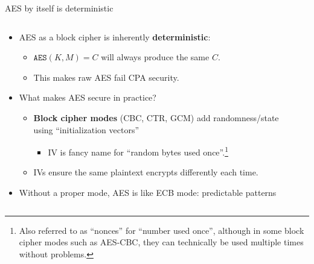 \documentclass[aspectratio=169, lualatex, handout]{beamer}
\begin{document}
\begin{frame}{AES by itself is deterministic}
	\begin{columns}[c]
		\begin{column}{0.7\textwidth}
			\begin{itemize}[<+->]
				\item AES as a block cipher is inherently \textbf{deterministic}:
				      \begin{itemize}
					      \item $\texttt{AES}(K, M) = C$ will always produce the same $C$.
					      \item This makes raw AES fail CPA security.
				      \end{itemize}
				\item What makes AES secure in practice?
				      \begin{itemize}
					      \item \textbf{Block cipher modes} (CBC, CTR, GCM) add randomness/state using ``initialization vectors''
					            \begin{itemize}
						            \item IV is fancy name for ``random bytes used once''.\footnote{Also referred to as ``nonces'' for ``number used once'', although in some block cipher modes such as AES-CBC, they can technically be used multiple times without problems.}
					            \end{itemize}
					      \item IVs ensure the same plaintext encrypts differently each time.
				      \end{itemize}
				\item Without a proper mode, AES is like ECB mode: predictable patterns
			\end{itemize}
		\end{column}
		\begin{column}{0.3\textwidth}
			\begin{center}
			\end{center}
		\end{column}
	\end{columns}
\end{frame}
\end{document}
